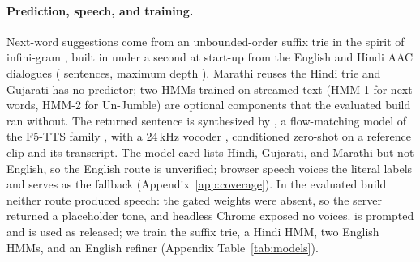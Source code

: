 \paragraph{Prediction, speech, and training.}
Next-word suggestions come from an unbounded-order suffix trie in the spirit of infini-gram \citep{liu2024infinigram}, built in under a second at start-up from the English and Hindi AAC dialogues (\IGSent{} sentences, maximum depth \IGDepth{}). Marathi reuses the Hindi trie and Gujarati has no predictor; two HMMs trained on streamed text (HMM-1 for next words, HMM-2 for Un-Jumble) are optional components that the evaluated build ran without.
The returned sentence is synthesized by \indicf{} \citep{ai4bharat2025indicf5}, a flow-matching model of the F5-TTS family \citep{chen2025f5tts}, with a 24\,kHz \vocos{} vocoder \citep{siuzdak2023vocos}, conditioned zero-shot on a reference clip and its transcript.
The model card lists Hindi, Gujarati, and Marathi but not English, so the English route is unverified; browser speech voices the literal labels and serves as the fallback (Appendix~\ref{app:coverage}).
In the evaluated build neither route produced speech: the gated \indicf{} weights were absent, so the server returned a placeholder tone, and headless Chrome exposed no voices.
\qwen{} is prompted and \indicf{} is used as released; we train the suffix trie, a Hindi HMM, two English HMMs, and an English \flant{} refiner (Appendix Table~\ref{tab:models}).
